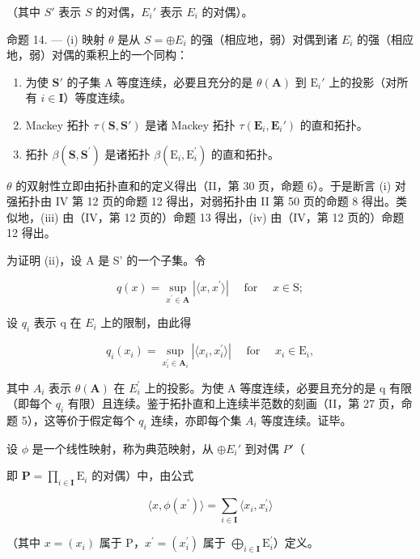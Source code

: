 （其中 \(S'\) 表示 \(S\) 的对偶，\(E_i'\) 表示 \(E_i\) 的对偶）。

命题 14. --- (i) 映射 \(\theta\) 是从 \(S = \oplus E_i\) 的强（相应地，弱）对偶到诸 \(E_i\) 的强（相应地，弱）对偶的乘积上的一个同构：

\begin{enumerate}
\def\labelenumi{(\roman{enumi})}
\setcounter{enumi}{1}
\item
  为使 \(\mathbf{S}'\) 的子集 A 等度连续，必要且充分的是 \(\theta (\mathbf{A})\) 到 \(\mathrm{E}_i'\) 上的投影（对所有 \(i\in \mathbf{I}\)）等度连续。
\item
  Mackey 拓扑 \(\tau(\mathbf{S},\mathbf{S}')\) 是诸 Mackey 拓扑 \(\tau(\mathbf{E}_i,\mathbf{E}_i')\) 的直和拓扑。
\item
  拓扑 \(\beta (\mathbf{S},\mathbf{S}^{\prime})\) 是诸拓扑 \(\beta (\mathrm{E}_i,\mathrm{E}_i^{\prime})\) 的直和拓扑。
\end{enumerate}

\(\theta\) 的双射性立即由拓扑直和的定义得出（II，第 30 页，命题 6）。于是断言 (i) 对强拓扑由 IV 第 12 页的命题 12 得出，对弱拓扑由 II 第 50 页的命题 8 得出。类似地，(iii) 由（IV，第 12 页的）命题 13 得出，(iv) 由（IV，第 12 页的）命题 12 得出。

为证明 (ii)，设 A 是 S' 的一个子集。令

\[
q (x) = \sup _ {x ^ {\prime} \in \mathbf {A}} | \langle x, x ^ {\prime} \rangle | \quad \text { for } \quad x \in \mathrm{S};\tag{11}
\]

设 \(q_{i}\) 表示 q 在 \(E_{i}\) 上的限制，由此得

\[
q _ {i} (x _ {i}) = \sup _ {x _ {i} ^ {\prime} \in \mathbf {A} _ {i}} | \langle x _ {i}, x _ {i} ^ {\prime} \rangle | \quad \text { for } \quad x _ {i} \in \mathrm{E} _ {i},\tag{12}
\]

其中 \(A_{i}\) 表示 \(\theta(\mathbf{A})\) 在 \(E_{i}^{\prime}\) 上的投影。为使 A 等度连续，必要且充分的是 q 有限（即每个 \(q_{i}\) 有限）且连续。鉴于拓扑直和上连续半范数的刻画（II，第 27 页，命题 5），这等价于假定每个 \(q_{i}\) 连续，亦即每个集 \(A_{i}\) 等度连续。证毕。

设 \(\phi\) 是一个线性映射，称为典范映射，从 \(\oplus E_i'\) 到对偶 \(P'\)（

即 \(\mathbf{P} = \prod_{i\in \mathbf{I}}\mathrm{E}_i\) 的对偶）中，由公式

\[
\langle x, \phi (x ^ {\prime}) \rangle = \sum_ {i \in \mathbf {I}} \langle x _ {i}, x _ {i} ^ {\prime} \rangle\tag{13}
\]

（其中 \(x = (x_{i})\) 属于 \(\mathrm{P}\)，\(x^{\prime} = (x_{i}^{\prime})\) 属于 \(\bigoplus_{i\in \mathbf{I}}\mathrm{E}_{i}^{\prime}\)）定义。

